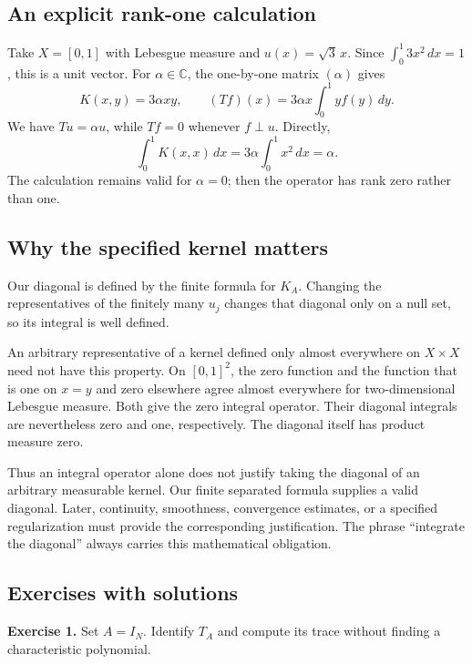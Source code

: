 \subsection{An explicit rank-one calculation}\label{finite-kernel-rank-one-example}

Take \(X=[0,1]\) with Lebesgue measure and \(u(x)=\sqrt{3}\,x\). Since \(\int_0^1 3x^2\,dx=1\), this is a unit vector. For \(\alpha\in\mathbb C\), the one-by-one matrix \((\alpha)\) gives
\[
K(x,y)=3\alpha xy,
\qquad
(Tf)(x)=3\alpha x\int_0^1 yf(y)\,dy.
\]
We have \(Tu=\alpha u\), while \(Tf=0\) whenever \(f\perp u\). Directly,
\[
\int_0^1 K(x,x)\,dx
=3\alpha\int_0^1x^2\,dx=\alpha.
\]
The calculation remains valid for \(\alpha=0\); then the operator has rank zero rather than one.

\subsection{Why the specified kernel matters}\label{kernel-diagonal-representatives}

Our diagonal is defined by the finite formula for \(K_A\). Changing the representatives of the finitely many \(u_j\) changes that diagonal only on a null set, so its integral is well defined.

An arbitrary representative of a kernel defined only almost everywhere on \(X\times X\) need not have this property. On \([0,1]^2\), the zero function and the function that is one on \(x=y\) and zero elsewhere agree almost everywhere for two-dimensional Lebesgue measure. Both give the zero integral operator. Their diagonal integrals are nevertheless zero and one, respectively. The diagonal itself has product measure zero.

Thus an integral operator alone does not justify taking the diagonal of an arbitrary measurable kernel. Our finite separated formula supplies a valid diagonal. Later, continuity, smoothness, convergence estimates, or a specified regularization must provide the corresponding justification. The phrase ``integrate the diagonal'' always carries this mathematical obligation.

\subsection{Exercises with solutions}\label{finite-kernel-exercises}

\textbf{Exercise 1.} Set \(A=I_N\). Identify \(T_A\) and compute its trace without finding a characteristic polynomial.

